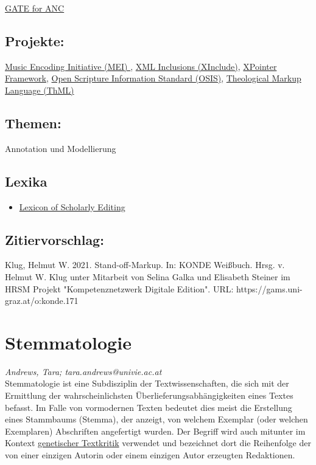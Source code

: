 \documentclass{article}
\begin{document}
\href{http://www.anc.org/tools/using-gate.html}{GATE for ANC}\subsection*{Projekte:}\href{https://music-encoding.org}{Music Encoding Initiative (MEI) }, \href{https://www.w3.org/TR/xinclude/}{XML Inclusions (XInclude)}, \href{https://www.w3.org/TR/xptr-framework/}{XPointer Framework}, \href{https://crosswire.org/osis/}{Open Scripture Information Standard (OSIS)}, \href{https://www.ccel.org/ThML/index.html}{Theological Markup Language (ThML)}\subsection*{Themen:}Annotation und Modellierung\subsection*{Lexika}\begin{itemize}\item \href{https://lexiconse.uantwerpen.be/index.php/lexicon/markup-standoff/}{Lexicon of Scholarly Editing}\end{itemize}\subsection*{Zitiervorschlag:}Klug, Helmut W. 2021. Stand-off-Markup. In: KONDE Weißbuch. Hrsg. v. Helmut W. Klug unter Mitarbeit von Selina Galka und Elisabeth Steiner im HRSM Projekt "Kompetenznetzwerk Digitale Edition". URL: https://gams.uni-graz.at/o:konde.171\newpage\section*{Stemmatologie} \emph{Andrews, Tara; tara.andrews@univie.ac.at }\\
        
    Stemmatologie ist eine Subdisziplin der Textwissenschaften, die sich mit der
                  Ermittlung der wahrscheinlichsten Überlieferungsabhängigkeiten eines Textes
                  befasst. Im Falle von vormodernen Texten bedeutet dies meist die Erstellung eines
                  Stammbaums (Stemma), der anzeigt, von welchem Exemplar (oder welchen Exemplaren)
                  Abschriften angefertigt wurden. Der Begriff wird auch mitunter im Kontext \href{http://gams.uni-graz.at/o:konde.90}{genetischer Textkritik} verwendet und
                  bezeichnet dort die Reihenfolge der von einer einzigen Autorin oder einem einzigen
                  Autor erzeugten Redaktionen. \\
            
\end{document}
